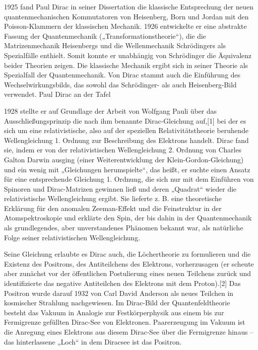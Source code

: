 1925 fand Paul Dirac in seiner Dissertation die klassische Entsprechung der neuen quantenmechanischen Kommutatoren von Heisenberg, Born und Jordan mit den Poisson-Klammern der klassischen Mechanik. 1926 entwickelte er eine abstrakte Fassung der Quantenmechanik („Transformationstheorie“), die die Matrizenmechanik Heisenbergs und die Wellenmechanik Schrödingers als Spezialfälle enthielt. Somit konnte er unabhängig von Schrödinger die Äquivalenz beider Theorien zeigen. Die klassische Mechanik ergibt sich in seiner Theorie als Spezialfall der Quantenmechanik. Von Dirac stammt auch die Einführung des Wechselwirkungsbilds, das sowohl das Schrödinger- als auch Heisenberg-Bild verwendet.
Paul Dirac an der Tafel

1928 stellte er auf Grundlage der Arbeit von Wolfgang Pauli über das Ausschließungsprinzip die nach ihm benannte Dirac-Gleichung auf,[1] bei der es sich um eine relativistische, also auf der speziellen Relativitätstheorie beruhende Wellengleichung 1. Ordnung zur Beschreibung des Elektrons handelt. Dirac fand sie, indem er von der relativistischen Wellengleichung 2. Ordnung von Charles Galton Darwin ausging (einer Weiterentwicklung der Klein-Gordon-Gleichung) und ein wenig mit „Gleichungen herumspielte“, das heißt, er suchte einen Ansatz für eine entsprechende Gleichung 1. Ordnung, die sich nur mit dem Einführen von Spinoren und Dirac-Matrizen gewinnen ließ und deren „Quadrat“ wieder die relativistische Wellengleichung ergibt. Sie lieferte z. B. eine theoretische Erklärung für den anomalen Zeeman-Effekt und die Feinstruktur in der Atomspektroskopie und erklärte den Spin, der bis dahin in der Quantenmechanik als grundlegendes, aber unverstandenes Phänomen bekannt war, als natürliche Folge seiner relativistischen Wellengleichung.

Seine Gleichung erlaubte es Dirac auch, die Löchertheorie zu formulieren und die Existenz des Positrons, des Antiteilchens des Elektrons, vorherzusagen (er scheute aber zunächst vor der öffentlichen Postulierung eines neuen Teilchens zurück und identifizierte das negative Antiteilchen des Elektrons mit dem Proton).[2] Das Positron wurde darauf 1932 von Carl David Anderson als neues Teilchen in kosmischer Strahlung nachgewiesen. Im Dirac-Bild der Quantenfeldtheorie besteht das Vakuum in Analogie zur Festkörperphysik aus einem bis zur Fermigrenze gefüllten Dirac-See von Elektronen. Paarerzeugung im Vakuum ist die Anregung eines Elektrons aus diesem Dirac-See über die Fermigrenze hinaus – das hinterlassene „Loch“ in dem Diracsee ist das Positron.



